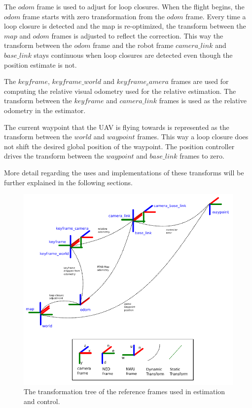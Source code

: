 \documentclass[letterpaper, 10 pt, conference]{ieeeconf}  %
\begin{document}
The $\mathit{odom}$ frame is used to adjust for loop closures. When the flight begins, the $\mathit{odom}$ frame starts with zero transformation from the $\mathit{odom}$ frame. Every time a loop closure is detected and the map is re-optimized, the transform between the $\mathit{map}$ and $\mathit{odom}$ frames is adjusted to reflect the correction. This way the transform between the $\mathit{odom}$ frame and the robot frame $\mathit{camera\_link}$ and $\mathit{base\_link}$ stays continuous when loop closures are detected even though the position estimate is not.

The $\mathit{keyframe}$, $\mathit{keyframe\_world}$ and $\mathit{keyframe_camera}$ frames are used for computing the relative visual odometry used for the relative estimation. The transform between the $\mathit{keyframe}$ and $\mathit{camera\_link}$ frames is used as the relative odometry in the estimator.

The current waypoint that the UAV is flying towards is represented as the transform between the $\mathit{world}$ and $\mathit{waypoint}$ frames. This way a loop closure does not shift the desired global position of the waypoint. The position controller drives the transform between the $\mathit{waypoint}$ and $\mathit{base\_link}$ frames to zero.

More detail regarding the uses and implementations of these transforms will be further explained in the following sections.


\begin{figure}
\centering
\includegraphics[width=0.9\linewidth]{tf_tree_relative_rtab}
\caption{The transformation tree of the reference frames used in estimation and control.}
\label{fig:tf_tree}
\end{figure}
\end{document}
